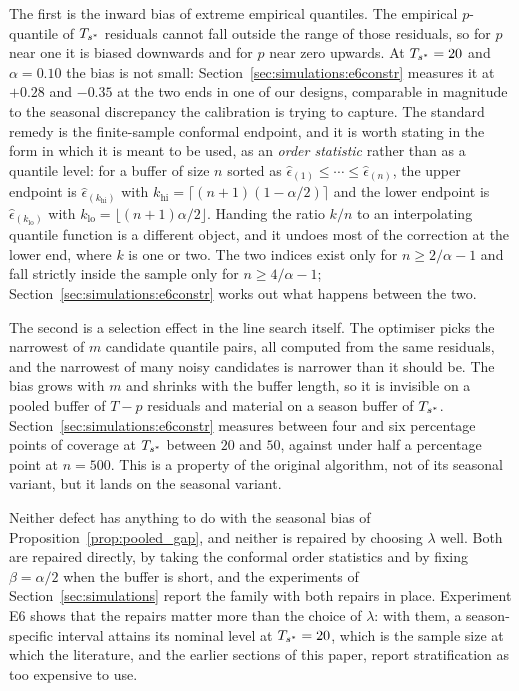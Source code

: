 The first is the inward bias of extreme empirical quantiles.  The
empirical $p$-quantile of $T_{s^*}$ residuals cannot fall outside the range of
those residuals, so for $p$ near one it is biased downwards and for $p$
near zero upwards.  At $T_{s^*} = 20$ and $\alpha = 0.10$ the bias is not
small: Section~\ref{sec:simulations:e6constr} measures it at $+0.28$ and $-0.35$
at the two ends in one of our designs, comparable in magnitude to the
seasonal discrepancy the calibration is trying to capture.  The standard
remedy is the finite-sample conformal endpoint, and it is worth stating in
the form in which it is meant to be used, as an \emph{order statistic}
rather than as a quantile level: for a buffer of size $n$ sorted as
$\hat{\epsilon}_{(1)} \leq \cdots \leq \hat{\epsilon}_{(n)}$, the upper
endpoint is $\hat{\epsilon}_{(k_{\text{hi}})}$ with
$k_{\text{hi}} = \lceil (n+1)(1-\alpha/2)\rceil$ and the lower endpoint is
$\hat{\epsilon}_{(k_{\text{lo}})}$ with
$k_{\text{lo}} = \lfloor (n+1)\alpha/2 \rfloor$.  Handing the ratio $k/n$
to an interpolating quantile function is a different object, and it undoes
most of the correction at the lower end, where $k$ is one or two.  The two
indices exist only for $n \geq 2/\alpha - 1$ and fall strictly inside the
sample only for $n \geq 4/\alpha - 1$;
Section~\ref{sec:simulations:e6constr} works out what happens between the two.

The second is a selection effect in the line search itself.  The optimiser
picks the narrowest of $m$ candidate quantile pairs, all computed from the
same residuals, and the narrowest of many noisy candidates is narrower than
it should be.  The bias grows with $m$ and shrinks with the buffer length,
so it is invisible on a pooled buffer of $T - p$ residuals and material on
a season buffer of $T_{s^*}$.  Section~\ref{sec:simulations:e6constr} measures between four
and six percentage points of coverage at $T_{s^*}$ between $20$ and $50$,
against under half a percentage point at $n = 500$.  This is a property of the
original algorithm, not of its seasonal variant, but it lands on the
seasonal variant.

Neither defect has anything to do with the seasonal bias of
Proposition~\ref{prop:pooled_gap}, and neither is repaired by choosing
$\lambda$ well.  Both are repaired directly, by taking the conformal order
statistics and by fixing $\beta = \alpha/2$ when the buffer is short, and
the experiments of Section~\ref{sec:simulations} report the family with
both repairs in place.  Experiment E6 shows that the repairs matter more
than the choice of $\lambda$: with them, a season-specific interval
attains its nominal level at $T_{s^*} = 20$, which is the sample size at which
the literature, and the earlier sections of this paper, report
stratification as too expensive to use.

